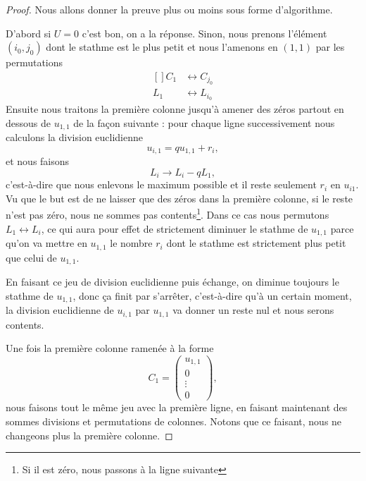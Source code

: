\begin{proof}
	Nous allons donner la preuve plus ou moins sous forme d'algorithme.

	D'abord si \( U=0\) c'est bon, on a la réponse. Sinon, nous prenons l'élément \( (i_0,j_0)\) dont le stathme est le plus petit et nous l'amenons en \( (1,1)\) par les permutations
	\begin{equation}
		\begin{aligned}[]
			C_1 & \leftrightarrow C_{j_0} \\
			L_1 & \leftrightarrow L_{i_0}
		\end{aligned}
	\end{equation}
	Ensuite nous traitons la première colonne jusqu'à amener des zéros partout en dessous de \( u_{1,1}\) de la façon suivante : pour chaque ligne successivement nous calculons la division euclidienne
	\begin{equation}
		u_{i,1}=qu_{1,1}+r_i,
	\end{equation}
	et nous faisons
	\begin{equation}
		L_i\to L_i-qL_1,
	\end{equation}
	c'est-à-dire que nous enlevons le maximum possible et il reste seulement \( r_i\) en \( u_{i1}\). Vu que le but est de ne laisser que des zéros dans la première colonne, si le reste n'est pas zéro, nous ne sommes pas contents\footnote{Si il est zéro, nous passons à la ligne suivante}. Dans ce cas nous permutons \( L_1\leftrightarrow L_i\), ce qui aura pour effet de strictement diminuer le stathme de \( u_{1,1}\) parce qu'on va mettre en \( u_{1,1}\) le nombre \( r_i\) dont le stathme est strictement plus petit que celui de \( u_{1,1}\).

	En faisant ce jeu de division euclidienne puis échange, on diminue toujours le stathme de \( u_{1,1}\), donc ça finit par s'arrêter, c'est-à-dire qu'à un certain moment, la division euclidienne de \( u_{i,1}\) par \( u_{1,1}\) va donner un reste nul et nous serons contents.

	Une fois la première colonne ramenée à la forme
	\begin{equation}
		C_1=\begin{pmatrix}
			u_{1,1} \\
			0       \\
			\vdots  \\
			0
		\end{pmatrix},
	\end{equation}
	nous faisons tout le même jeu avec la première ligne, en faisant maintenant des sommes divisions et permutations de colonnes. Notons que ce faisant, nous ne changeons plus la première colonne.


\end{proof}
